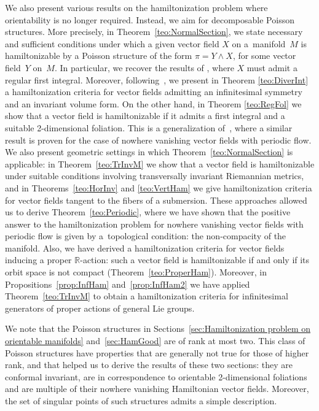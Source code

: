 \documentclass[10pt,a4paper]{amsart}
\numberwithin{equation}{section}
\begin{document}
We also present various results on the hamiltonization problem where orientability is no longer required. Instead, we aim for decomposable Poisson structures. More precisely, in Theorem~\ref{teo:NormalSection}, we state necessary and sufficient conditions under which a given vector field $X$ on a~manifold~$M$ is hamiltonizable by a Poisson structure of the form $\pi = Y \wedge X$, for some vector field~$Y$ on~$M$. In particular, we recover the results of \cite{AHA-06,Hojman-96}, where $X$ must admit a regular first integral.
Moreover, following~\cite{LPS-12}, we present in Theorem \ref{teo:DiverInt} a hamiltonization criteria for vector fields admitting an infinitesimal symmetry and an invariant volume form. On the other hand, in Theorem \ref{teo:RegFol} we show that a vector field is hamiltonizable if it admits a first integral and a suitable 2-dimensional foliation. This is a generalization of~\cite[Theorem~2]{FGS-05}, where a similar result is proven for the case of nowhere vanishing vector fields with periodic flow. We also present geometric settings in which Theorem~\ref{teo:NormalSection} is applicable: in Theorem~\ref{teo:TrInvM} we show that a vector field is hamiltonizable under suitable conditions involving transversally invariant Riemannian metrics, and in Theorems~\ref{teo:HorInv} and \ref{teo:VertHam} we give hamiltonization criteria for vector fields tangent to the fibers of a submersion. These approaches allowed us to derive Theorem~\ref{teo:Periodic}, where we have shown that the positive answer to the hamiltonization problem for nowhere vanishing vector fields with periodic flow is given by a~topological condition: the non-compacity of the manifold. Also, we have derived a hamiltonization criteria for vector fields inducing a proper $\mathbb{R}$-action: such a vector field is hamiltonizable if and only if its orbit space is not compact (Theorem~\ref{teo:ProperHam}). Moreover, in Propositions~\ref{prop:InfHam} and~\ref{prop:InfHam2} we have applied Theorem~\ref{teo:TrInvM} to obtain a hamiltonization criteria for infinitesimal generators of proper actions of general Lie groups.

We note that the Poisson structures in Sections~\ref{sec:Hamiltonization problem on orientable manifolds} and~\ref{sec:HamGood} are of rank at most two. This class of Poisson structures have properties that are generally not true for those of higher rank, and that helped us to derive the results of these two sections: they are conformal invariant, are in correspondence to orientable 2-dimensional foliations and are multiple of their nowhere vanishing Hamiltonian vector fields. Moreover, the set of singular points of such structures admits a simple description.
\end{document}

